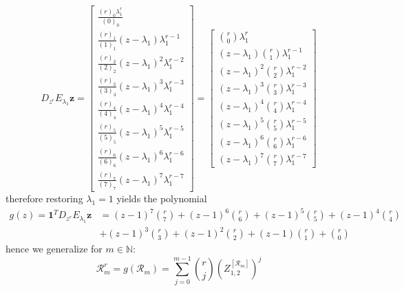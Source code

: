 \begin{displaymath}
D_{{z}^{r}}E_{\lambda_{1}}\boldsymbol{z} = \left[\begin{matrix}\frac{{\left(r\right)}_{0} \lambda_{1}^{r}}{{\left(0\right)}_{0}}\\\frac{{\left(r\right)}_{1}}{{\left(1\right)}_{1}} \left(z - \lambda_{1}\right) \lambda_{1}^{r - 1}\\\frac{{\left(r\right)}_{2}}{{\left(2\right)}_{2}} \left(z - \lambda_{1}\right)^{2} \lambda_{1}^{r - 2}\\\frac{{\left(r\right)}_{3}}{{\left(3\right)}_{3}} \left(z - \lambda_{1}\right)^{3} \lambda_{1}^{r - 3}\\\frac{{\left(r\right)}_{4}}{{\left(4\right)}_{4}} \left(z - \lambda_{1}\right)^{4} \lambda_{1}^{r - 4}\\\frac{{\left(r\right)}_{5}}{{\left(5\right)}_{5}} \left(z - \lambda_{1}\right)^{5} \lambda_{1}^{r - 5}\\\frac{{\left(r\right)}_{6}}{{\left(6\right)}_{6}} \left(z - \lambda_{1}\right)^{6} \lambda_{1}^{r - 6}\\\frac{{\left(r\right)}_{7}}{{\left(7\right)}_{7}} \left(z - \lambda_{1}\right)^{7} \lambda_{1}^{r - 7}\end{matrix}\right]
 = \left[\begin{matrix}{\binom{r}{0}} \lambda_{1}^{r}\\\left(z - \lambda_{1}\right) {\binom{r}{1}} \lambda_{1}^{r - 1}\\\left(z - \lambda_{1}\right)^{2} {\binom{r}{2}} \lambda_{1}^{r - 2}\\\left(z - \lambda_{1}\right)^{3} {\binom{r}{3}} \lambda_{1}^{r - 3}\\\left(z - \lambda_{1}\right)^{4} {\binom{r}{4}} \lambda_{1}^{r - 4}\\\left(z - \lambda_{1}\right)^{5} {\binom{r}{5}} \lambda_{1}^{r - 5}\\\left(z - \lambda_{1}\right)^{6} {\binom{r}{6}} \lambda_{1}^{r - 6}\\\left(z - \lambda_{1}\right)^{7} {\binom{r}{7}} \lambda_{1}^{r - 7}\end{matrix}\right]
\end{displaymath}
therefore restoring $\lambda_{1}=1$ yields the polynomial
\begin{displaymath}
\begin{split}
g{\left (z \right )} = \boldsymbol{1}^{T}D_{{z}^{r}}E_{\lambda_{1}}\boldsymbol{z} &= \left(z - 1\right)^{7} {\binom{r}{7}} + \left(z - 1\right)^{6} {\binom{r}{6}} + \left(z - 1\right)^{5} {\binom{r}{5}} + \left(z - 1\right)^{4} {\binom{r}{4}} \\
                    &+ \left(z - 1\right)^{3} {\binom{r}{3}} + \left(z - 1\right)^{2} {\binom{r}{2}} + \left(z - 1\right) {\binom{r}{1}} + {\binom{r}{0}}
\end{split}
\end{displaymath}
hence we generalize for $m\in\mathbb{N}$:
\begin{displaymath}
\mathcal{R}_{m}^{r} = g{\left (\mathcal{R}_{m} \right )} = \sum_{j=0}^{m-1}{\binom{r}{j}}{\left(Z_{1,2}^{[\mathcal{R}_{m}]}\right)^{j} }
\end{displaymath}

